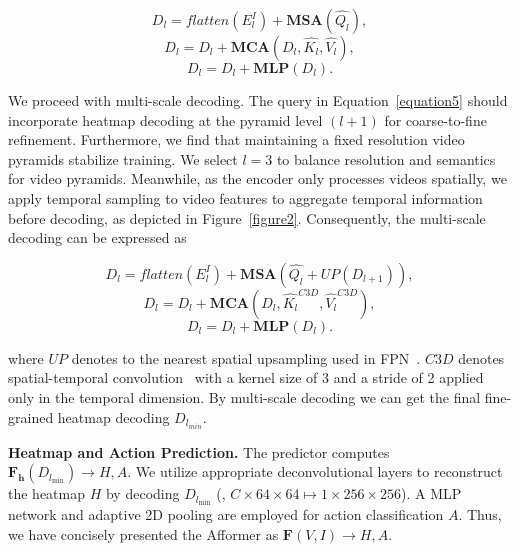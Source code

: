 \documentclass[10pt,twocolumn,letterpaper]{article}
\begin{document}
\begin{equation}
D_l = flatten(E^I_l) + \boldsymbol{MSA}(\hat{Q_l}), \label{equation5} 
\end{equation}
\vspace{-5mm}
\begin{equation}
D_l = D_l + \boldsymbol{MCA}(D_l,\hat{K_l},\hat{V_l}), \label{equation6}
\end{equation}
\vspace{-5mm}
\begin{equation}
D_l = D_l + \boldsymbol{MLP}(D_l). \label{equation7}
\end{equation}

We proceed with multi-scale decoding. The query in Equation~\ref{equation5} should incorporate heatmap decoding at the pyramid level $(l+1)$ for coarse-to-fine refinement. Furthermore, we find that maintaining a fixed resolution video pyramids stabilize training. We select $l=3$ to balance resolution and semantics for video pyramids. Meanwhile, as the encoder only processes videos spatially, we apply temporal sampling to video features to aggregate temporal information before decoding, as depicted in Figure~\ref{figure2}. Consequently, the multi-scale decoding can be expressed as

\begin{equation}
D_l =  flatten(E^I_l) + \boldsymbol{MSA}(\hat{Q_l} + UP(D_{l+1})), \label{equation8} 
\end{equation}
\vspace{-5mm}
\begin{equation}
D_l = D_l + \boldsymbol{MCA}(D_l,\hat{K_l}^{C3D},\hat{V_l}^{C3D}), \label{equation9}
\end{equation}
\vspace{-5mm}
\begin{equation}
D_l = D_l + \boldsymbol{MLP}(D_l). \label{equation10}
\end{equation}

\noindent where $UP$ denotes to the nearest spatial upsampling used in FPN~\cite{fpn}. ${C3D}$ denotes spatial-temporal convolution~\cite{c3d} with a kernel size of 3 and a stride of 2 applied only in the temporal dimension. By multi-scale decoding we can get the final fine-grained heatmap decoding $D_{l_{min}}$.

\noindent\textbf{Heatmap and Action Prediction.} The predictor computes $\boldsymbol{F_h}(D_{l_{\min}}) \rightarrow H, A$. We utilize appropriate deconvolutional layers to reconstruct the heatmap $H$ by decoding $D_{l_{\min}}$ (\eg, $C\times64\times64 \mapsto 1\times256\times256$). A MLP network and adaptive 2D pooling are employed for action classification $A$. Thus, we have concisely presented the Afformer as $\boldsymbol{F}(V, I) \rightarrow H, A$.
\end{document}
